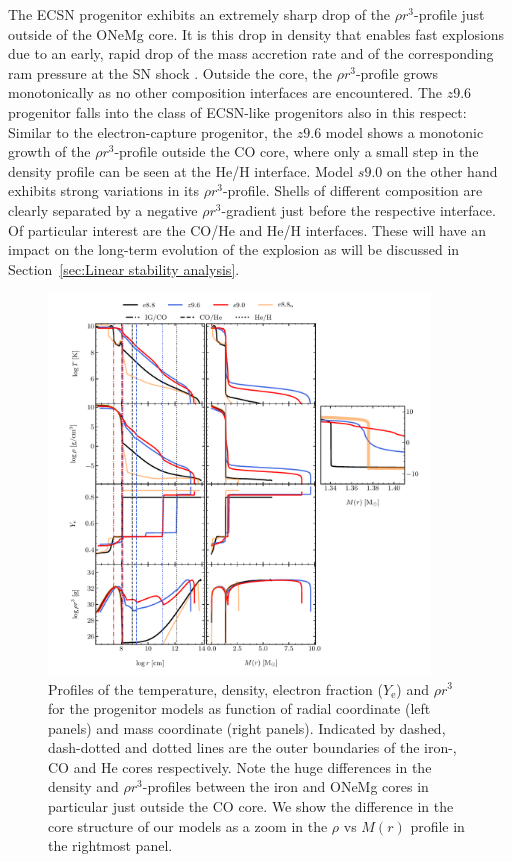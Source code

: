 \documentclass[fleqn,usenatbib]{mnras}
\begin{document}
The ECSN progenitor exhibits an extremely sharp drop of the $\rho r^3$-profile just outside of the ONeMg core. It is this drop in density that enables fast explosions due to an early, rapid drop of the mass accretion rate and of the corresponding ram pressure at the SN shock \citep{Kitaura2006}. Outside the core, the $\rho r^3$-profile grows monotonically as no other composition interfaces are encountered.
The $z9.6$ progenitor falls into the class of ECSN-like progenitors also in this respect: Similar to the electron-capture progenitor, the $z9.6$ model shows a monotonic growth of the $\rho r^3$-profile outside the CO core, where only a small step in the density profile can be seen at the He/H interface.
Model $s9.0$ on the other hand exhibits strong variations in its $\rho r^3$-profile. Shells of different composition are clearly separated by a negative $\rho r^3$-gradient just before the respective interface. Of particular interest are the CO/He and He/H interfaces. These will have an impact on the long-term evolution of the explosion as will be discussed in Section~\ref{sec:Linear stability analysis}.

\begin{figure}
 \centering
 \includegraphics[width=0.9\textwidth,trim=1cm 0.0cm 1cm 0cm]{./pic/progenitors_tem_rho_ye_rhor_paper.pdf}
 \caption{Profiles of the temperature, density, electron fraction ($Y_{\text{e}}$) and $\rho r^3$ for the progenitor models as function of radial coordinate (left panels) and mass coordinate (right panels). Indicated by dashed, dash-dotted and dotted lines are the outer boundaries of the iron-, CO and He cores respectively. Note the huge differences in the density and $\rho r^3$-profiles between the iron and ONeMg cores in particular just outside the CO core. We show the difference in the core structure of our models as a zoom in the $\rho$ vs $M(r)$ profile in the rightmost panel.}
 \label{fig:prog_tem_rho_ye_rhor}
\end{figure}
\end{document}
